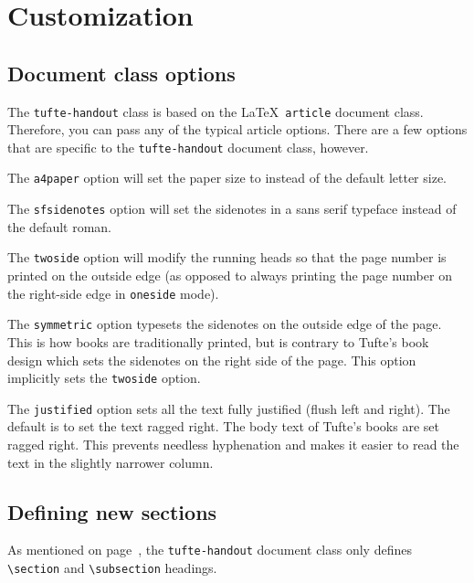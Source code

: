 \documentclass[nofonts]{tufte-handout}
\begin{document}
\section{Customization}\label{sec:customization}
\subsection{Document class options}\label{sec:options}
The \Verb|tufte-handout| class is based on the \LaTeX\ \Verb|article|
document class.  Therefore, you can pass any of the typical article
options.  There are a few options that are specific to the
\Verb|tufte-handout| document class, however.

The \Verb|a4paper| option will set the paper size to  instead of
the default  letter size.

The \Verb|sfsidenotes| option will set the sidenotes in a \textsf{sans
serif} typeface instead of the default roman.

The \Verb|twoside| option will modify the running heads so that the page
number is printed on the outside edge (as opposed to always printing the page
number on the right-side edge in \Verb|oneside| mode).  

The \Verb|symmetric| option typesets the sidenotes on the outside edge of
the page.  This is how books are traditionally printed, but is contrary to
Tufte's book design which sets the sidenotes on the right side of the page.
This option implicitly sets the \Verb|twoside| option.

The \Verb|justified| option sets all the text fully justified (flush left
and right).  The default is to set the text ragged right.  
The body text of Tufte's books are set ragged right.  This prevents
needless hyphenation and makes it easier to read the text in the slightly
narrower column.

\subsection{Defining new sections}\label{sec:defining-sections}
As mentioned on page~\pageref{sec:headings}, the \Verb|tufte-handout|
document class only defines \Verb|\section| and \Verb|\subsection|
headings.  
\end{document}
